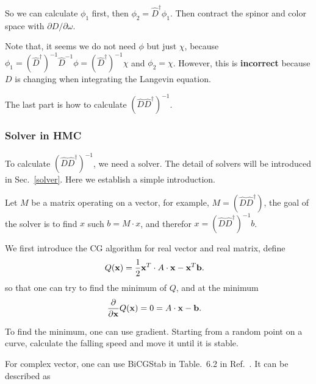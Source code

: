 So we can calculate $\phi _1$ first, then $\phi _2 = \hat{D}^{\dagger}\phi _1$. Then contract the spinor and color space with $\partial D / \partial \omega$.

Note that, it seems we do not need $\phi$ but just $\chi$, because $\phi _1=(\hat{D}^{\dagger})^{-1}\hat{D}^{-1}\phi=(\hat{D}^{\dagger})^{-1}\chi$ and $\phi _2=\chi$. However, this is \textcolor[rgb]{1,0,0}{\textbf{incorrect}} because $D$ is changing when integrating the Langevin equation.

The last part is how to calculate $(\hat{D}\hat{D}^{\dagger})^{-1}$.

\subsubsection{\label{Solver_In_HMC}Solver in HMC}

To calculate $(\hat{D}\hat{D}^{\dagger})^{-1}$, we need a solver. The detail of solvers will be introduced in Sec.~\ref{solver}. Here we establish a simple introduction.

Let $M$ be a matrix operating on a vector, for example, $M=(\hat{D}\hat{D}^{\dagger})$, the goal of the solver is to find $x$ such $b=M\cdot x$, and therefor $x=(\hat{D}\hat{D}^{\dagger})^{-1}b$.

We first introduce the CG algorithm for real vector and real matrix, define
\begin{equation}
\begin{split}
&Q({\bf x})=\frac{1}{2}{\bf x}^T \cdot A \cdot {\bf x}-{\bf x}^T {\bf b}.
\end{split}
\end{equation}
so that one can try to find the minimum of $Q$, and at the minimum
\begin{equation}
\begin{split}
&\frac{\partial }{\partial {\bf x}}Q({\bf x})=0=A\cdot {\bf x}-{\bf b}.
\end{split}
\end{equation}

To find the minimum, one can use gradient. Starting from a random point on a curve, calculate the falling speed and move it until it is stable.

For complex vector, one can use BiCGStab in Table.~6.2 in Ref.~\cite{latticeqcdbook2010}. It can be described as
 
